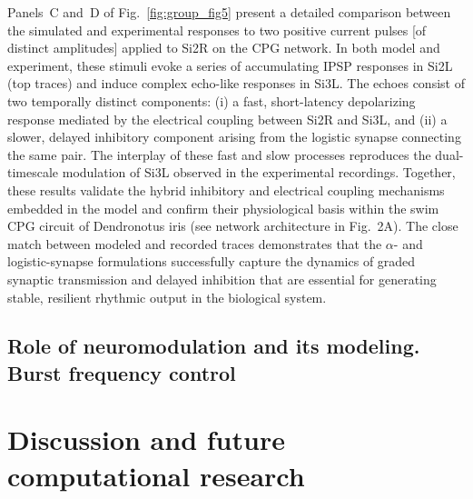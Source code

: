 \documentclass[nofootinbib,aip,amsmath,amssymb,reprint,twocolumn,10pt]{revtex4-2}
\begin{document}
Panels~C and~D of Fig.~\ref{fig:group_fig5} present a detailed comparison between the simulated and experimental responses to two positive current pulses [of distinct amplitudes] applied to Si2R on the CPG network. In both model and experiment, these stimuli evoke a series of accumulating IPSP responses in Si2L (top traces) and induce complex echo-like responses in Si3L. The echoes consist of two temporally distinct components: (i) a fast, short-latency depolarizing response mediated by the electrical  coupling between Si2R and Si3L, and (ii) a slower, delayed inhibitory component arising from the logistic synapse connecting the same pair. The interplay of these fast and slow processes reproduces the dual-timescale modulation of Si3L observed in the experimental recordings.
Together, these results validate the hybrid inhibitory and electrical coupling mechanisms embedded in the model and confirm their physiological basis within the swim CPG circuit of Dendronotus iris (see network architecture in Fig.~2A). The close match between modeled and recorded traces demonstrates that the $\alpha$- and logistic-synapse formulations successfully capture the dynamics of graded synaptic transmission and delayed inhibition that are essential for generating stable, resilient rhythmic output in the biological system.


\subsection{Role of neuromodulation and its modeling. Burst frequency control}



\section{Discussion and future computational research}

\label{fig:supp} 
\end{document}
